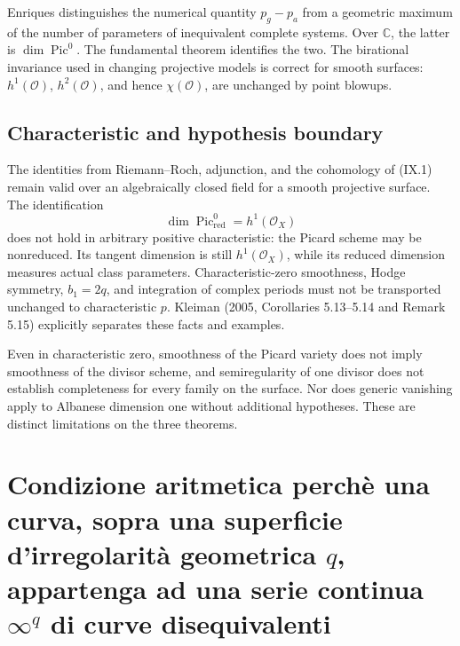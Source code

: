 Enriques distinguishes the numerical quantity \(p_g-p_a\) from a geometric maximum of the number of parameters of inequivalent complete systems. Over \(\mathbb C\), the latter is \(\dim\operatorname{Pic}^0\). The fundamental theorem identifies the two. The birational invariance used in changing projective models is correct for smooth surfaces: \(h^1(\mathcal O)\), \(h^2(\mathcal O)\), and hence \(\chi(\mathcal O)\), are unchanged by point blowups.

\subsection{Characteristic and hypothesis boundary}\label{cp2-ix-1-3}

The identities from Riemann--Roch, adjunction, and the cohomology of (IX.1) remain valid over an algebraically closed field for a smooth projective surface. The identification
\[
\dim\operatorname{Pic}^0_{\mathrm{red}}=h^1(\mathcal O_X)
\]
does not hold in arbitrary positive characteristic: the Picard scheme may be nonreduced. Its tangent dimension is still \(h^1(\mathcal O_X)\), while its reduced dimension measures actual class parameters. Characteristic-zero smoothness, Hodge symmetry, \(b_1=2q\), and integration of complex periods must not be transported unchanged to characteristic \(p\). Kleiman (2005, Corollaries 5.13--5.14 and Remark 5.15) explicitly separates these facts and examples.

Even in characteristic zero, smoothness of the Picard variety does not imply smoothness of the divisor scheme, and semiregularity of one divisor does not establish completeness for every family on the surface. Nor does generic vanishing apply to Albanese dimension one without additional hypotheses. These are distinct limitations on the three theorems.



\section{Condizione aritmetica perchè una curva, sopra una superficie d'irregolarità geometrica \texorpdfstring{\(q\)}{q}, appartenga ad una serie continua \texorpdfstring{\(\infty^q\)}{infinity to q} di curve disequivalenti}\label{cp2-ix-2}

